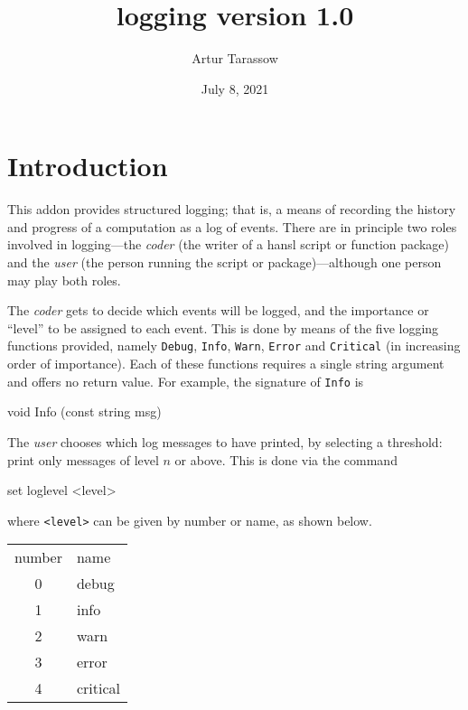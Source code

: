 \documentclass{article}
\begin{document}
\setlength{\parindent}{0pt}
\setlength{\parskip}{1ex}

\newcommand{\argname}[1]{\textsl{#1}}

\title{logging version 1.0}
\author{Artur Tarassow}
\date{July 8, 2021}
\maketitle

\section{Introduction}

This addon provides structured logging; that is, a means of recording
the history and progress of a computation as a log of events. There
are in principle two roles involved in logging---the \textit{coder}
(the writer of a hansl script or function package) and the
\textit{user} (the person running the script or package)---although
one person may play both roles.

The \textit{coder} gets to decide which events will be logged, and the
importance or ``level'' to be assigned to each event. This is done by
means of the five logging functions provided, namely \texttt{Debug},
\texttt{Info}, \texttt{Warn}, \texttt{Error} and \texttt{Critical} (in
increasing order of importance).  Each of these functions requires a
single string argument and offers no return value. For example, the
signature of \texttt{Info} is
\begin{code}
void Info (const string msg)
\end{code}

The \textit{user} chooses which log messages to have printed, by
selecting a threshold: print only messages of level $n$ or above.
This is done via the command
\begin{code}
set loglevel <level>
\end{code}
where \verb|<level>| can be given by number or name, as shown below.

\begin{center}
  \begin{tabular}{cl}
    number & name \\[4pt]
    0 & debug \\
    1 & info \\
    2 & warn \\
    3 & error \\
    4 & critical
  \end{tabular}
\end{center}
\end{document}
